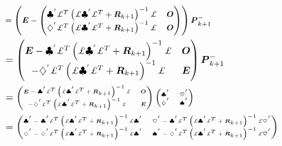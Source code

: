 \begin{align}
  &=
  {\footnotesize
    \left(\boldsymbol{E} -
    \begin{pmatrix}
      \clubsuit^{'} \pounds^{T} \left(\pounds \clubsuit^{'} \pounds^{T} + \boldsymbol{R}_{k+1}\right)^{-1} \pounds & \boldsymbol{O}\\
      \diamondsuit^{'} \pounds^{T} \left(\pounds \clubsuit^{'} \pounds^{T} + \boldsymbol{R}_{k+1}\right)^{-1} \pounds & \boldsymbol{O}
    \end{pmatrix}
    \right) \boldsymbol{P}_{k+1}^{-}}\\
  &=
  \begin{pmatrix}
    \boldsymbol{E} - \clubsuit^{'} \pounds^{T} \left(\pounds \clubsuit^{'} \pounds^{T} + \boldsymbol{R}_{k+1}\right)^{-1} \pounds & \boldsymbol{O}\\
    - \diamondsuit^{'} \pounds^{T} \left(\pounds \clubsuit^{'} \pounds^{T} + \boldsymbol{R}_{k+1}\right)^{-1} \pounds & \boldsymbol{E}
  \end{pmatrix}
  \boldsymbol{P}_{k+1}^{-}\\
  &=
  {\tiny
    \begin{pmatrix}
      \boldsymbol{E} - \clubsuit^{'} \pounds^{T} \left(\pounds \clubsuit^{'} \pounds^{T} + \boldsymbol{R}_{k+1}\right)^{-1} \pounds & \boldsymbol{O}\\
      - \diamondsuit^{'} \pounds^{T} \left(\pounds \clubsuit^{'} \pounds^{T} + \boldsymbol{R}_{k+1}\right)^{-1} \pounds & \boldsymbol{E}
    \end{pmatrix}
    \begin{pmatrix}
      \clubsuit^{'} & \heartsuit^{'}\\
      \diamondsuit^{'} & \spadesuit^{'}
    \end{pmatrix}
  }\\
  &=
  {\tiny
    \begin{pmatrix}
      \clubsuit^{'} - \clubsuit^{'} \pounds^{T} \left(\pounds \clubsuit^{'} \pounds^{T} + \boldsymbol{R}_{k+1}\right)^{-1} \pounds \clubsuit^{'} & \heartsuit^{'} - \clubsuit^{'} \pounds^{T} \left(\pounds \clubsuit^{'} \pounds^{T} + \boldsymbol{R}_{k+1}\right)^{-1} \pounds \heartsuit^{'}\\
      \diamondsuit^{'} - \diamondsuit^{'} \pounds^{T} \left(\pounds \clubsuit^{'} \pounds^{T} + \boldsymbol{R}_{k+1}\right)^{-1} \pounds \clubsuit^{'} & \spadesuit^{'} - \diamondsuit^{'} \pounds^{T} \left(\pounds \clubsuit^{'} \pounds^{T} + \boldsymbol{R}_{k+1}\right)^{-1} \pounds \heartsuit^{'}
    \end{pmatrix}
  }
\end{align}

